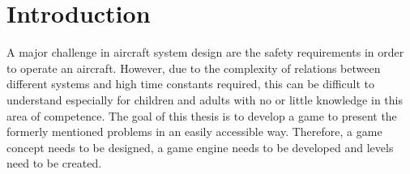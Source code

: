 \section{Introduction}\label{sec:introduction}
A major challenge in aircraft system design are the safety requirements in order to operate an aircraft.
However, due to the complexity of relations between different systems and high time constants required, this can be difficult
to understand especially for children and adults with no or little knowledge in this area of competence.
The goal of this thesis is to develop a game to present the formerly mentioned problems in an easily
accessible way.
Therefore, a game concept needs to be designed, a game engine needs to be developed and levels need to be created.
